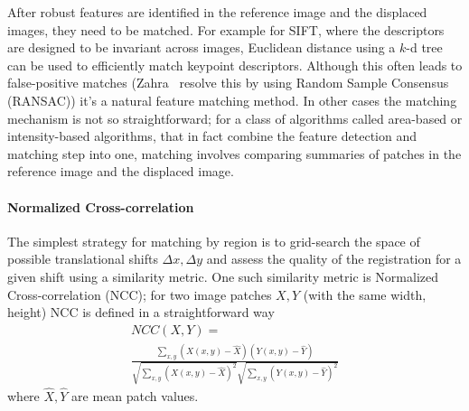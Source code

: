 After robust features are identified in the reference image and the displaced images, they need to be matched.
%
For example for SIFT, where the descriptors are designed to be invariant across images, Euclidean distance using a \(k\)-d tree can be used to efficiently match keypoint descriptors.
%
Although this often leads to false-positive matches (Zahra \etal~resolve this by using Random Sample Consensus (RANSAC)) it's a natural feature matching method.
%
In other cases the matching mechanism is not so straightforward; for a class of algorithms called area-based or intensity-based algorithms, that in fact combine the feature detection and matching step into one, matching involves comparing summaries of patches in the reference image and the displaced image.

\paragraph{Normalized Cross-correlation}
The simplest strategy for matching by region is to grid-search the space of possible translational shifts \(\Delta x, \Delta y\) and assess the quality of the registration for a given shift using a similarity metric.
%
One such similarity metric is Normalized Cross-correlation (NCC); for two image patches \(X, Y\) (with the same width, height) NCC is defined in a straightforward way
\begin{multline}
	NCC(X, Y) = \\ \frac{\sum_{x,y} \left(X(x,y) - \hat{X}\right) \left(Y(x,y) - \hat{Y}\right)}{\sqrt{\sum_{x,y} \left(X(x,y) - \hat{X}\right)^2} \sqrt{ \sum_{x,y} \left(Y(x,y) - \hat{Y}\right)^2 }}
\end{multline}
where \(\hat{X}, \hat{Y}\) are mean patch values.

